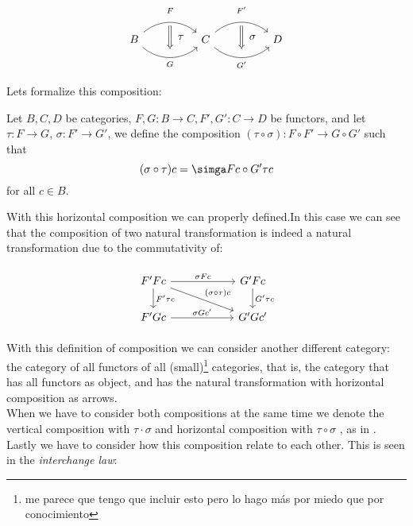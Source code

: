 \[
\begin{tikzcd}[column sep=huge]
B
  \arrow[bend left=40]{r}[name=F,label=above:$\scriptstyle F$]{}
  \arrow[bend right=40]{r}[name=G,label=below:$\scriptstyle G$]{} &
C
  \arrow[bend left=40]{r}[name=F',label=above:$\scriptstyle F'$]{}
  \arrow[bend right=40]{r}[name=G',label=below:$\scriptstyle G'$]{}&
D
    \arrow[shorten <=3pt,shorten >=3pt,Rightarrow,to path={(F) -- node[label=right:$\tau$] {} (G)}]{}
\arrow[shorten <=3pt,shorten >=3pt,Rightarrow,to path={(F') -- node[label=right:$\sigma$] {} (G')}]{}
\end{tikzcd}
\]

Lets formalize this composition:
\begin{definition}\label{horizontal-composition}
Let $B,C,D$ be categories, $F,G: B \to C, F',G':C\to D$ be functors, and let $\tau: F \to G$, $\sigma:F'\to G'$, we define the composition $(\tau \circ \sigma): F\circ F' \to G\circ G'$ such that $$(\sigma \circ \tau) c = \simga F c \circ G' \tau c$$  for all $c\in B$.
\end{definition}

With this horizontal composition we can properly defined.In this case we can see that the composition of two natural transformation is indeed a natural transformation due to the commutativity of:

\[
  \begin{tikzpicture}
  \node {\begin{tikzcd}[column sep=20mm]
      F'Fc      \ar[r,"\sigma F c"]
      \ar[d,"F'\tau c"]
      \ar[dr,"(\sigma\circ \tau)c"]
      & G'Fc\ar[d,"G'\tau c"]\\
      F'Gc\ar[r,"\sigma Gc'"] & G'Gc'
  \end{tikzcd}};
\end{tikzpicture}
\]
 

With this definition of composition we can consider another different category: the category of all functors of all (small)\footnote{me parece que tengo que incluir esto pero lo hago más por miedo que por conocimiento} categories, that is, the category that has all functors as object, and has the natural transformation with horizontal composition as arrows.\\

When we have to consider both compositions at the same time we denote the vertical composition with $\tau \cdot \sigma$ and horizontal composition with $\tau \circ \sigma$ , as in  \cite{mac2013categories}. Lastly we have to consider how this composition relate to each other. This is seen in the \emph{interchange law}:\\

